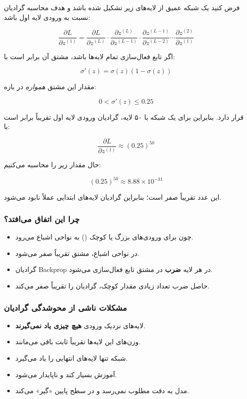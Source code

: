 \documentclass{article}
\begin{document}
فرض کنید یک شبکه عمیق از لایه‌های زیر تشکیل شده باشد و هدف محاسبه گرادیان نسبت به ورودی لایه اول باشد:

\[
\frac{\partial L}{\partial z^{(1)}} 
= 
\frac{\partial L}{\partial z^{(L)}} 
\cdot 
\frac{\partial z^{(L)}}{\partial z^{(L-1)}} 
\cdot 
\frac{\partial z^{(L-1)}}{\partial z^{(L-2)}} 
\cdots 
\frac{\partial z^{(2)}}{\partial z^{(1)}}
\]

اگر تابع فعال‌سازی تمام لایه‌ها  باشد، مشتق آن برابر است با:

\[
\sigma'(z) = \sigma(z)(1-\sigma(z))
\]

مقدار این مشتق \emph{همواره} در بازه:

\[
0 < \sigma'(z) \leq 0.25
\]

قرار دارد. بنابراین برای یک شبکه با ۵۰ لایه، گرادیان ورودی لایه اول تقریباً برابر است با:

\[
\frac{\partial L}{\partial z^{(1)}} \approx (0.25)^{50}
\]

حال مقدار زیر را محاسبه می‌کنیم:

\[
(0.25)^{50} \approx 8.88 \times 10^{-31}
\]

این عدد تقریباً صفر است؛ بنابراین گرادیان لایه‌های ابتدایی عملاً نابود می‌شود.

\subsubsection*{چرا این اتفاق می‌افتد؟}

\begin{itemize}
	\item چون  برای ورودی‌های بزرگ یا کوچک () به نواحی اشباع می‌رود.
	\item در نواحی اشباع، مشتق تقریباً صفر می‌شود.
	\item گرادیان Backprop در هر لایه \textbf{ضرب} در مشتق تابع فعال‌سازی می‌شود.
	\item حاصل ضرب تعداد زیادی مقدار کوچک، گرادیان را تقریباً صفر می‌کند.
\end{itemize}

\subsubsection*{مشکلات ناشی از محوشدگی گرادیان}

\begin{itemize}
	\item لایه‌های نزدیک ورودی \textbf{هیچ چیزی یاد نمی‌گیرند}.
	\item وزن‌های این لایه‌ها تقریباً ثابت باقی می‌مانند.
	\item شبکه تنها لایه‌های انتهایی را یاد می‌گیرد.
	\item آموزش بسیار کند و ناپایدار می‌شود.
	\item مدل به دقت مطلوب نمی‌رسد و در سطح پایین «گیر» می‌کند.
\end{itemize}
\end{document}
